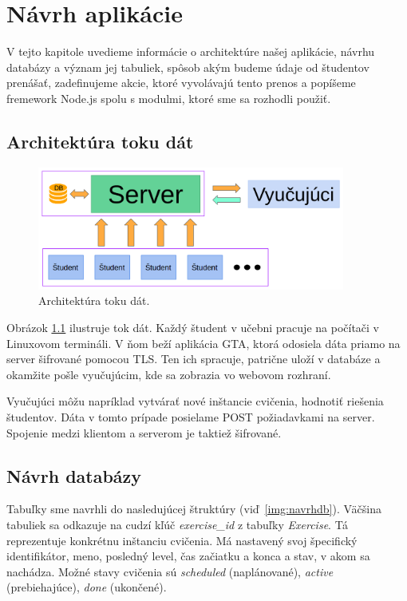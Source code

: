 \chapter{Návrh aplikácie}
\label{kap:navrh}

V tejto kapitole uvedieme informácie o architektúre našej aplikácie, návrhu databázy a význam jej tabuliek, spôsob akým budeme údaje od študentov prenášať, zadefinujeme akcie, ktoré vyvolávajú tento prenos a popíšeme fremework Node.js spolu s modulmi, ktoré sme sa rozhodli použiť.

\section{Architektúra toku dát}
\label{sec:architekturadata}

\begin{figure}[h]
	\centerline{\includegraphics[width=0.9\textwidth]{images/architekturadat.png}}
	\caption[Architektúra toku dát]{Architektúra toku dát.}
	\label{img:architekturadata}
\end{figure}

Obrázok \ref{img:architekturadata} ilustruje tok dát. Každý študent v učebni pracuje
na počítači v Linuxovom termináli. V ňom beží aplikácia GTA, ktorá odosiela dáta
priamo na server šifrované pomocou TLS. Ten ich spracuje, patrične uloží v databáze
a okamžite pošle vyučujúcim, kde sa zobrazia vo webovom rozhraní.

Vyučujúci môžu napríklad vytvárať nové inštancie cvičenia, hodnotiť riešenia študentov.
Dáta v tomto prípade posielame POST požiadavkami na server. Spojenie medzi klientom
a serverom je taktiež šifrované.

\section{Návrh databázy}
\label{sec:navrhdb}

Tabuľky sme navrhli do nasledujúcej štruktúry (viď~\ref{img:navrhdb}).
Väčšina tabuliek sa odkazuje na cudzí kľúč \textit{exercise\_id} z tabuľky
\textit{Exercise}. Tá reprezentuje konkrétnu inštanciu cvičenia. Má nastavený svoj
špecifický identifikátor, meno, posledný level, čas začiatku a konca a stav, v
akom sa nachádza. Možné stavy cvičenia sú \textit{scheduled} (naplánované),
\textit{active} (prebiehajúce), \textit{done} (ukončené).

